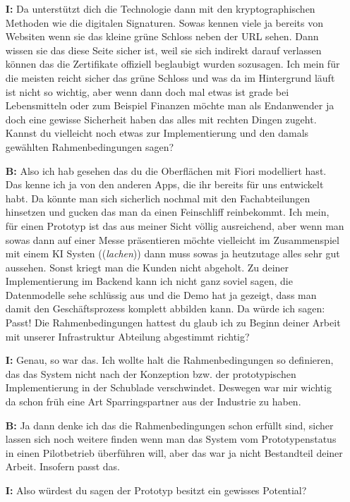 \begin{itemize}
  \item[\textbf{I:}] Da unterstützt dich die Technologie dann mit den kryptographischen Methoden wie die digitalen Signaturen. Sowas kennen viele ja bereits von Websiten wenn sie das kleine grüne Schloss neben der URL sehen. Dann wissen sie das diese Seite sicher ist, weil sie sich indirekt darauf verlassen können das die Zertifikate offiziell beglaubigt wurden sozusagen. Ich mein für die meisten reicht sicher das grüne Schloss und was da im Hintergrund läuft ist nicht so wichtig, aber wenn dann doch mal etwas ist grade bei Lebensmitteln oder zum Beispiel Finanzen möchte man als Endanwender ja doch eine gewisse Sicherheit haben das alles mit rechten Dingen zugeht. Kannst du vielleicht noch etwas zur Implementierung und den damals gewählten Rahmenbedingungen sagen?
  \item[\textbf{B:}] Also ich hab gesehen das du die Oberflächen mit Fiori modelliert hast. Das kenne ich ja von den anderen Apps, die ihr bereits für uns entwickelt habt. Da könnte man sich sicherlich nochmal mit den Fachabteilungen hinsetzen und gucken das man da einen Feinschliff reinbekommt. Ich mein, für einen Prototyp ist das aus meiner Sicht völlig ausreichend, aber wenn man sowas dann auf einer Messe präsentieren möchte vielleicht im Zusammenspiel mit einem KI Systen ((\textit{lachen})) dann muss sowas ja heutzutage alles sehr gut aussehen. Sonst kriegt man die Kunden nicht abgeholt. Zu deiner Implementierung im Backend kann ich nicht ganz soviel sagen, die Datenmodelle sehe schlüssig aus und die Demo hat ja gezeigt, dass man damit den Geschäftsprozess komplett abbilden kann. Da würde ich sagen: Passt! Die Rahmenbedingungen hattest du glaub ich zu Beginn deiner Arbeit mit unserer Infrastruktur Abteilung abgestimmt richtig?
  \item[\textbf{I:}] Genau, so war das. Ich wollte halt die Rahmenbedingungen so definieren, das das System nicht nach der Konzeption bzw. der prototypischen Implementierung in der Schublade verschwindet. Deswegen war mir wichtig da schon früh eine Art Sparringspartner aus der Industrie zu haben.
  \item[\textbf{B:}] Ja dann denke ich das die Rahmenbedingungen schon erfüllt sind, sicher lassen sich noch weitere finden wenn man das System vom Prototypenstatus in einen Pilotbetrieb überführen will, aber das war ja nicht Bestandteil deiner Arbeit. Insofern passt das.
  \item[\textbf{I:}] Also würdest du sagen der Prototyp besitzt ein gewisses Potential?

\end{itemize}
